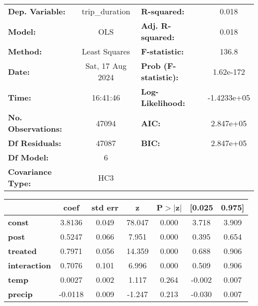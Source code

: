 \begin{center}
\begin{tabular}{lclc}
\toprule
\textbf{Dep. Variable:}    &  trip\_duration  & \textbf{  R-squared:         } &      0.018   \\
\textbf{Model:}            &       OLS        & \textbf{  Adj. R-squared:    } &      0.018   \\
\textbf{Method:}           &  Least Squares   & \textbf{  F-statistic:       } &      136.8   \\
\textbf{Date:}             & Sat, 17 Aug 2024 & \textbf{  Prob (F-statistic):} &  1.62e-172   \\
\textbf{Time:}             &     16:41:46     & \textbf{  Log-Likelihood:    } & -1.4233e+05  \\
\textbf{No. Observations:} &       47094      & \textbf{  AIC:               } &  2.847e+05   \\
\textbf{Df Residuals:}     &       47087      & \textbf{  BIC:               } &  2.847e+05   \\
\textbf{Df Model:}         &           6      & \textbf{                     } &              \\
\textbf{Covariance Type:}  &       HC3        & \textbf{                     } &              \\
\bottomrule
\end{tabular}
\begin{tabular}{lcccccc}
                      & \textbf{coef} & \textbf{std err} & \textbf{z} & \textbf{P$> |$z$|$} & \textbf{[0.025} & \textbf{0.975]}  \\
\midrule
\textbf{const}        &       3.8136  &        0.049     &    78.047  &         0.000        &        3.718    &        3.909     \\
\textbf{post}         &       0.5247  &        0.066     &     7.951  &         0.000        &        0.395    &        0.654     \\
\textbf{treated}      &       0.7971  &        0.056     &    14.359  &         0.000        &        0.688    &        0.906     \\
\textbf{interaction}  &       0.7076  &        0.101     &     6.996  &         0.000        &        0.509    &        0.906     \\
\textbf{temp}         &       0.0027  &        0.002     &     1.117  &         0.264        &       -0.002    &        0.007     \\
\textbf{precip}       &      -0.0118  &        0.009     &    -1.247  &         0.213        &       -0.030    &        0.007     \\

\end{tabular}
\end{center}
